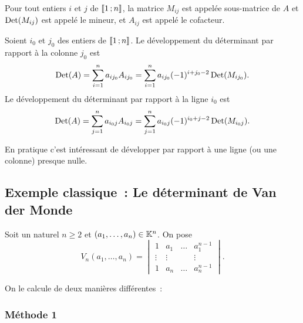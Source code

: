 \begin{defdef}
  Pour tout entiers \(i\) et \(j\) de \(\mathopen{\llbracket}1\mathclose{}\mathpunct{};n\mathclose{\rrbracket}\), la matrice \(M_{ij}\) est appelée sous-matrice de \(A\) et \(\operatorname{Det}(M_{ij})\) est appelé le mineur, et \(A_{ij}\) est appelé le cofacteur.
\end{defdef}
%
\begin{theo}
  Soient \(i_0\) et \(j_0\) des entiers de \(\mathopen{\llbracket}1\mathclose{}\mathpunct{};n\mathclose{\rrbracket}\). Le développement du déterminant par rapport à la colonne \(j_0\) est
  \begin{equation}
    \operatorname{Det}(A) = \sum_{i=1}^n a_{ij_0}A_{ij_0} = \sum_{i=1}^n a_{ij_0}(-1)^{i+j_0-2} \operatorname{Det}(M_{ij_0}).
  \end{equation}
  Le développement du déterminant par rapport à la ligne \(i_0\) est
  \begin{equation}
    \operatorname{Det}(A) = \sum_{j=1}^n a_{i_0j}A_{i_0j} = \sum_{j=1}^n a_{i_0j}(-1)^{i_0+j-2} \operatorname{Det}(M_{i_0j}).
  \end{equation}

  En pratique c'est intéressant de développer par rapport à une ligne (ou une colonne) presque nulle.
\end{theo}

\subsection{Exemple classique~: Le déterminant de Van der Monde}

Soit un naturel \(n \geqslant 2\) et \((a_1, \ldots, a_n) \in \mathbb{K}^n\). On pose
\begin{equation}
  V_n(a_1, \ldots, a_n) =
  \begin{vmatrix}
    1 & a_1 & \ldots & a_1^{n-1} \\
    \vdots & \vdots &  & \vdots \\
    1 & a_n & \ldots & a_n^{n-1}
  \end{vmatrix}.
\end{equation}

On le calcule de deux manières différentes~:

\subsubsection{Méthode 1}

